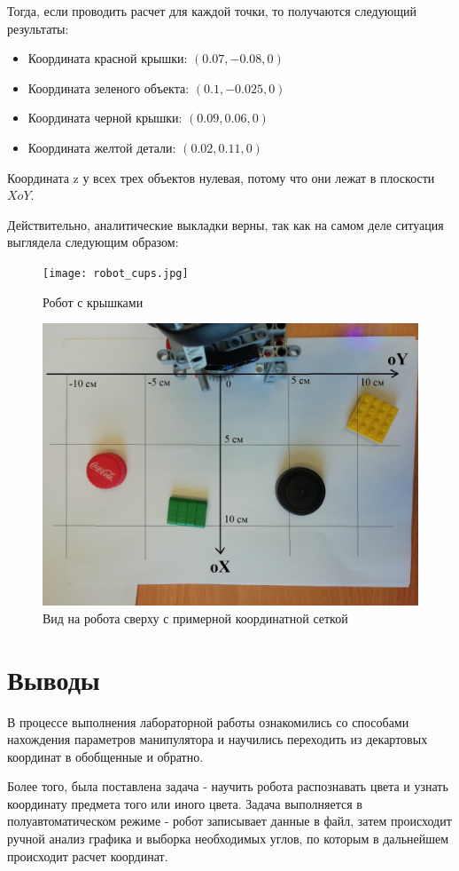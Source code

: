 \documentclass{article}
\begin{document}
\par Тогда, если проводить расчет для каждой точки, то получаются следующий результаты:
\begin{itemize}
\item Координата красной крышки: $(0.07 , -0.08 , 0)$
\item Координата зеленого объекта: $(0.1 , -0.025 , 0)$
\item Координата черной крышки: $(0.09 , 0.06 , 0)$
\item Координата желтой детали: $(0.02 , 0.11 , 0)$
\end{itemize}
Координата z у всех трех объектов нулевая, потому что они лежат в плоскости $XoY$.
\par Действительно, аналитические выкладки верны, так как на самом деле ситуация выглядела следующим образом:
\begin{figure}[h!]
    \centering
    \texttt{[image: robot\_cups.jpg]}
    \caption{Робот с крышками}
\end{figure}
\begin{figure}[h!]
    \centering
    \includegraphics[width=300 pt]{cups_coords.jpg}
    \caption{Вид на робота сверху с примерной координатной сеткой}
\end{figure}

\section{Выводы}
\par В процессе выполнения лабораторной работы ознакомились со способами нахождения параметров манипулятора и научились переходить из декартовых координат в обобщенные и обратно.
\par Более того, была поставлена задача - научить робота распознавать цвета и узнать координату предмета того или иного цвета. Задача выполняется в полуавтоматическом режиме - робот записывает данные в файл, затем происходит ручной анализ графика и выборка необходимых углов, по которым в дальнейшем происходит расчет координат.
\end{document}
